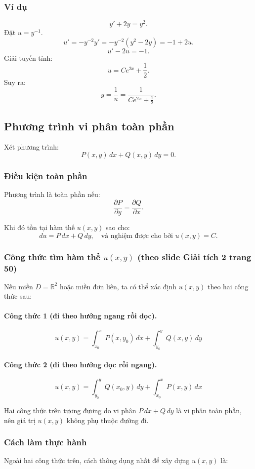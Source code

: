 \documentclass[12pt,a4paper]{article}
\begin{document}
\subsubsection*{Ví dụ}
\[
y' + 2y = y^2.
\]
Đặt $u = y^{-1}$.  
\[
u' = -y^{-2}y' = -y^{-2}(y^2 - 2y) = -1 + 2u.
\]
\[
u' - 2u = -1.
\]
Giải tuyến tính:
\[
u = Ce^{2x} + \frac{1}{2}.
\]
Suy ra:
\[
y = \frac{1}{u} = \frac{1}{Ce^{2x} + \frac{1}{2}}.
\]

\subsection{Phương trình vi phân toàn phần}

Xét phương trình:
\[
P(x,y)\,dx + Q(x,y)\,dy = 0.
\]

\subsubsection*{Điều kiện toàn phần}
Phương trình là toàn phần nếu:
\[
\frac{\partial P}{\partial y} = \frac{\partial Q}{\partial x}.
\]

Khi đó tồn tại hàm thế $u(x,y)$ sao cho:
\[
du = P\,dx + Q\,dy,
\quad\text{và nghiệm được cho bởi } u(x,y)=C.
\]

\subsubsection*{Công thức tìm hàm thế $u(x,y)$ (theo slide Giải tích 2 trang 50)}
Nếu miền $D=\mathbb{R}^2$ hoặc miền đơn liên, ta có thể xác định $u(x,y)$ theo hai công thức sau:

\paragraph{Công thức 1 (đi theo hướng ngang rồi dọc).}
\[
\boxed{
u(x,y) = \int_{x_0}^{x} P(x,y_0)\,dx
           + \int_{y_0}^{y} Q(x,y)\,dy
}
\]

\paragraph{Công thức 2 (đi theo hướng dọc rồi ngang).}
\[
\boxed{
u(x,y) = \int_{y_0}^{y} Q(x_0,y)\,dy
           + \int_{x_0}^{x} P(x,y)\,dx
}
\]

Hai công thức trên tương đương do vi phân $P\,dx + Q\,dy$ là vi phân toàn phần, nên giá trị $u(x,y)$ không phụ thuộc đường đi.

\bigskip

\subsubsection*{Cách làm thực hành}
Ngoài hai công thức trên, cách thông dụng nhất để xây dựng $u(x,y)$ là:
\end{document}
